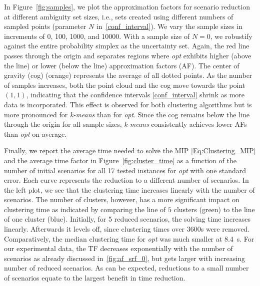 \documentclass{article}
\begin{document}
In Figure~\ref{fig:samples}, we plot the approximation factors for scenario reduction at different ambiguity set sizes, i.e., sets created using different numbers of sampled points (parameter \(N\) in~\eqref{conf_interval}).  
We vary the sample sizes in increments of \num{0}, \num{100}, \num{1000}, and \num{10000}.  
With a sample size of \(N=0\), we robustify against the entire probability simplex as the uncertainty set.  
Again, the red line passes through the origin and separates regions where \emph{opt} exhibits higher (above the line) or lower (below the line) approximation factors (AF).  
The center of gravity (cog) (orange) represents the average of all dotted points.  
As the number of samples increases, both the point cloud and the cog move towards the point \((1,1)\), indicating that the confidence intervals \eqref{conf_interval} shrink as more data is incorporated.  
This effect is observed for both clustering algorithms but is more pronounced for \emph{k-means} than for \emph{opt}.  
Since the cog remains below the line through the origin for all sample sizes, \emph{k-means} consistently achieves lower AFs than \emph{opt} on average.  

Finally, we report the average time needed to solve the MIP \eqref{Eq:Clustering_MIP} and the average time factor in Figure~\ref{fig:cluster_time} as a function of the number of initial scenarios for all 17 tested instances for \emph{opt} with one standard error.
Each curve represents the reduction to a different number of scenarios.
In the left plot, we see that the clustering time increases linearly with the number of scenarios.
The number of clusters, however, has a more significant impact on clustering time as indicated by comparing the line of $5$ clusters (green) to the line of one cluster (blue).
Initially, for 5 reduced scenarios, the solving time increases linearly.
Afterwards it levels off, since clustering times over 3600s were removed.
Comparatively, the median clustering time for \emph{opt} was much smaller at $8.4$~s.
For our experimental data, the TF decreases exponentially with the number of scenarios as already discussed in~\ref{fig:af_srf_0}, but gets larger with increasing number of reduced scenarios.
As can be expected, reductions to a small number of scenarios equate to the largest benefit in time reduction.
\end{document}
